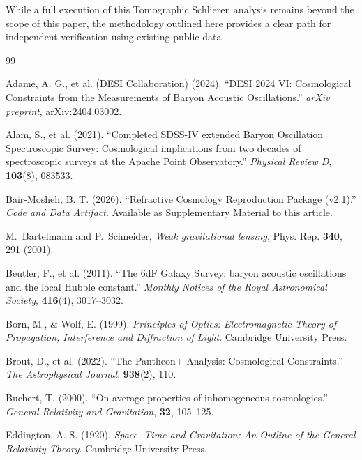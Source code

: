 \documentclass[11pt]{article}
\begin{document}
While a full execution of this Tomographic Schlieren analysis remains beyond the scope of this paper, the methodology outlined here provides a clear path for independent verification using existing public data.

\begin{thebibliography}{99}

Adame, A. G., et al. (DESI Collaboration) (2024).
``DESI 2024 VI: Cosmological Constraints from the Measurements of Baryon Acoustic Oscillations.''
\textit{arXiv preprint}, arXiv:2404.03002.

Alam, S., et al. (2021).
``Completed SDSS-IV extended Baryon Oscillation Spectroscopic Survey: Cosmological implications from two decades of spectroscopic surveys at the Apache Point Observatory.''
\textit{Physical Review D}, \textbf{103}(8), 083533.

Bair-Mosheh, B. T. (2026).
``Refractive Cosmology Reproduction Package (v2.1).''
\textit{Code and Data Artifact}.
Available as Supplementary Material to this article.

M.~Bartelmann and P.~Schneider, 
\textit{Weak gravitational lensing}, 
Phys. Rep. \textbf{340}, 291 (2001).

Beutler, F., et al. (2011). 
``The 6dF Galaxy Survey: baryon acoustic oscillations and the local Hubble constant.'' 
\textit{Monthly Notices of the Royal Astronomical Society}, \textbf{416}(4), 3017--3032.

Born, M., \& Wolf, E. (1999).
\textit{Principles of Optics: Electromagnetic Theory of Propagation, Interference and Diffraction of Light}.
Cambridge University Press.

Brout, D., et al. (2022).
``The Pantheon+ Analysis: Cosmological Constraints.''
\textit{The Astrophysical Journal}, \textbf{938}(2), 110.

Buchert, T. (2000).
``On average properties of inhomogeneous cosmologies.''
\textit{General Relativity and Gravitation}, \textbf{32}, 105--125.

Eddington, A. S. (1920).
\textit{Space, Time and Gravitation: An Outline of the General Relativity Theory}.
Cambridge University Press.


\end{thebibliography}
\end{document}
